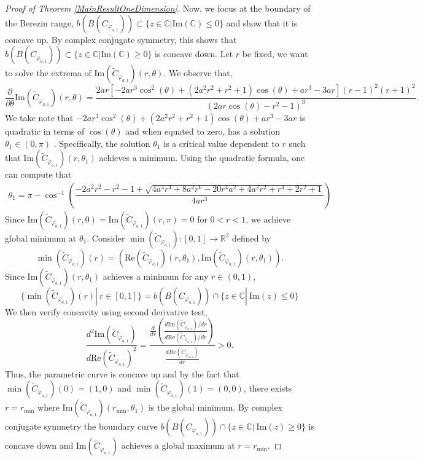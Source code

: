 \documentclass{amsart}
\theoremstyle{remark}
\begin{document}
\begin{proof}[Proof of Theorem \ref{MainResultOneDimension}]
Now, we focus at the boundary of the Berezin range, $b(B(C_{\varphi_{a,1}})) \subset \{z \in \mathbb{C}|\mathrm{Im}(\mathbb{C}) \leq 0\} $ and show that it is concave up. By complex conjugate symmetry, this shows that $b(B(C_{\varphi_{a,1}})) \subset \{z \in \mathbb{C}|\mathrm{Im}(\mathbb{C}) \geq 0\} $ is concave down. Let $r$ be fixed, we want to solve the extrema of $\mathrm{Im}(\widetilde{C}_{\varphi_{a,1}})(r,\theta)$. 
We observe that, 
\[\dfrac{\partial}{\partial\theta}\mathrm{Im}(\widetilde{C}_{\varphi_{a,1}})(r,\theta)=\dfrac{2ar[-2ar^3\cos^2(\theta)+(2a^2r^2+r^2+1)\cos(\theta)+ar^3-3ar](r-1)^2(r+1)^2}{(2ar\cos(\theta)-r^2-1)^3}.\]
We take note that $-2ar^3\cos^2(\theta)+(2a^2r^2+r^2+1)\cos(\theta)+ar^3-3ar$ is quadratic in terms of $\cos(\theta)$ and when equated to zero, has a solution $\theta_1 \in (0,\pi)$ . Specifically, the solution $\theta_1$ is a critical value  dependent to $r$ such that $\mathrm{Im}(\widetilde{C}_{\varphi_{a,1}})(r,\theta_1)$ achieves a minimum. Using the quadratic formula, one can compute that 
\begin{align}\label{theta_1}
\theta_1 = \pi - \cos^{-1}\left(\dfrac{-2a^2r^2-r^2-1+\sqrt{4a^4r^4+8a^2r^6-20r^4a^2+4a^2r^2+r^4+2r^2+1}}{4ar^3}\right)
\end{align}
Since $\mathrm{Im}(\widetilde{C}_{\varphi_{a,1}})(r,0)=\mathrm{Im}(\widetilde{C}_{\varphi_{a,1}})(r,\pi)=0$ for $0<r<1$, we achieve global minimum at $\theta_1$.
Consider  $\min(\widetilde{C}_{\varphi_{a,1}}): [0,1] \rightarrow \mathbb{R}^2$ defined by 
\[\min(\widetilde{C}_{\varphi_{a,1}})(r)=(\mathrm{Re}(\widetilde{C}_{\varphi_{a,1}})(r,\theta_1),\mathrm{Im}(\widetilde{C}_{\varphi_{a,1}})(r,\theta_1)).\]
Since $\mathrm{Im}(\widetilde{C}_{\varphi_{a,1}})(r,\theta_1)$ achieves a minimum for any $r \in (0,1)$, 
\[\{\min(\widetilde{C}_{\varphi_{a,1}})(r)|\ r \in [0,1]\} = b(B(C_{\varphi_{a,1}})) \cap \{z \in \mathbb{C}|\ \mathrm{Im}(z) \leq 0\} \]
We then verify concavity using second derivative test, 
\[\dfrac{d^2\mathrm{Im}(\widetilde{C}_{\varphi_{a,1}})}{d\mathrm{Re}(\widetilde{C}_{\varphi_{a,1}})^2}=\dfrac{\frac{d}{dr}\left(\frac{d\mathrm{Im}(\widetilde{C}_{\varphi_{a,1}})/dr}{d\mathrm{Re}(\widetilde{C}_{\varphi_{a,1}})/dr}\right)}{\frac{dRe(\widetilde{C}_{\varphi_{a,1}})}{dr}} > 0.\]
Thus, the parametric curve is concave up and by the fact that $\min(\widetilde{C}_{\varphi_{a,1}})(0)=(1,0)$ and $\min(\widetilde{C}_{\varphi_{a,1}})(1)=(0,0)$, there exists $r=r_{\mathrm{min}}$ where $\mathrm{Im}(\widetilde{C}_{\varphi_{a,1}})(r_{\mathrm{min}},\theta_1)$ is the global minimum. By complex conjugate symmetry the boundary curve $b(B(C_{\varphi_{a,1}})) \cap \{z \in \mathbb{C}|\ \mathrm{Im}(z) \geq 0\}$ is concave down and $\mathrm{Im}(\widetilde{C}_{\varphi_{a,1}})$ achieves a global maximum at $r=r_{\mathrm{min}}$.


\end{proof}
\end{document}
